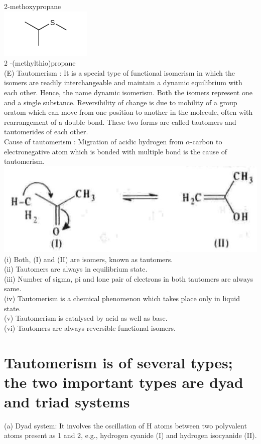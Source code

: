 \documentclass[10pt]{article}
\begin{document}
2-methoxypropane\\
\includegraphics{smile-91643cfed44fe1fb0bf18633cb7f69d27e103746}\\
2 -(methylthio)propane\\
(E) Tautomerism : It is a special type of functional isomerism in which the isomers are readily interchangeable and maintain a dynamic equilibrium with each other. Hence, the name dynamic isomerism. Both the isomers represent one and a single substance. Reversibility of change is due to mobility of a group oratom which can move from one position to another in the molecule, often with rearrangement of a double bond. These two forms are called tautomers and tautomerides of each other.\\
Cause of tautomerism : Migration of acidic hydrogen from $\alpha$-carbon to electronegative atom which is bonded with multiple bond is the cause of tautomerism.\\
\includegraphics[max width=\textwidth, center]{2025_01_28_8470952b98110cec3aabg-041(1)}\\
(i) Both, (I) and (II) are isomers, known as tautomers.\\
(ii) Tautomers are always in equilibrium state.\\
(iii) Number of sigma, pi and lone pair of electrons in both tautomers are always same.\\
(iv) Tautomerism is a chemical phenomenon which takes place only in liquid state.\\
(v) Tautomerism is catalysed by acid as well as base.\\
(vi) Tautomers are always reversible functional isomers.

\section*{Tautomerism is of several types; the two important types are dyad and triad systems}
(a) Dyad system: It involves the oscillation of H atoms between two polyvalent atoms present as 1 and 2, e.g., hydrogen cyanide (I) and hydrogen isocyanide (II).
\end{document}
